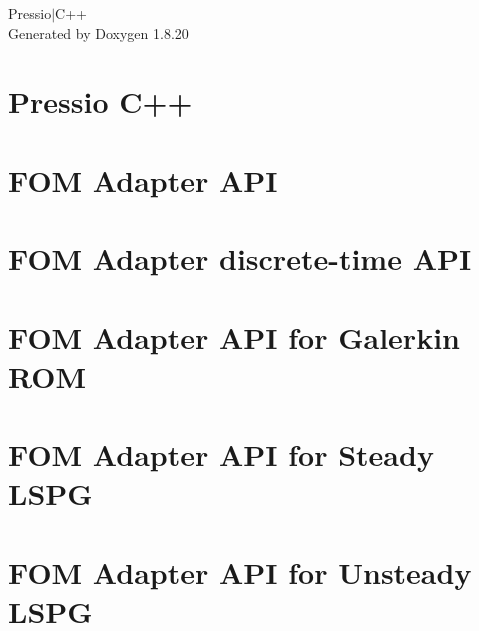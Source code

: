 \let\mypdfximage\pdfximage\def\pdfximage{\immediate\mypdfximage}\documentclass[twoside]{book}
\newcommand{\+}{\discretionary{\mbox{\scriptsize$\hookleftarrow$}}{}{}}
\newcommand{\clearemptydoublepage}{%
  \newpage{\pagestyle{empty}\cleardoublepage}%
}
\begin{document}
\hypersetup{pageanchor=false,
             bookmarksnumbered=true,
             pdfencoding=unicode
            }
\begin{titlepage}
\vspace*{7cm}
\begin{center}%
{\Large Pressio$\vert$\+C++ }\\
\vspace*{1cm}
{\large Generated by Doxygen 1.8.20}\\
\end{center}
\end{titlepage}
\clearemptydoublepage
{}
\tableofcontents
\clearemptydoublepage
{}
\hypersetup{pageanchor=true}

\chapter{Pressio C++}
\label{index}\hypertarget{index}{}
\chapter{F\+OM Adapter A\+PI}
\label{md_pages_adapter_api}

\chapter{F\+OM Adapter discrete-\/time A\+PI}
\label{md_pages_adapter_apis_adapter_discrete_time_api}

\chapter{F\+OM Adapter A\+PI for Galerkin R\+OM}
\label{md_pages_adapter_apis_adapter_galerkin_api}

\chapter{F\+OM Adapter A\+PI for Steady L\+S\+PG}
\label{md_pages_adapter_apis_adapter_steady_lspg_api}

\chapter{F\+OM Adapter A\+PI for Unsteady L\+S\+PG}
\label{md_pages_adapter_apis_adapter_unsteady_lspg_api}

\end{document}
